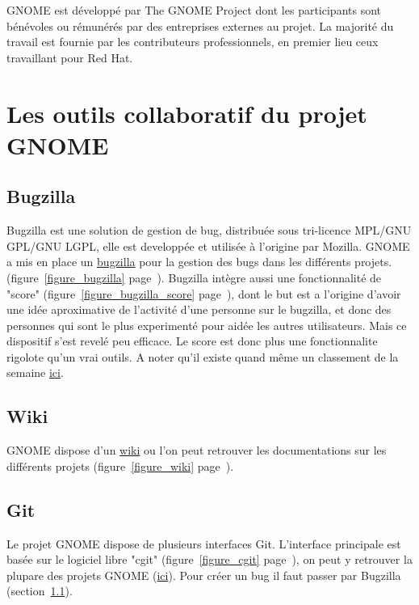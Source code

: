 \documentclass[12pt]{report}
\begin{document}
GNOME est développé par The GNOME Project dont les participants sont
bénévoles ou rémunérés par des entreprises externes au projet. La
majorité du travail est fournie par les contributeurs professionnels,
en premier lieu ceux travaillant pour Red Hat.

\section{Les outils collaboratif du projet GNOME} 
\subsection{Bugzilla}
\label{bugzilla}
Bugzilla est une solution de gestion de bug, distribuée sous tri-licence 
MPL/GNU GPL/GNU LGPL, elle est developpée et utilisée à l'origine par Mozilla.
GNOME a mis en place un \href{https://bugzilla.gnome.org}{bugzilla} pour 
la gestion des bugs dans les différents projets.
(figure~\ref{figure_bugzilla} page~\pageref{figure_bugzilla}).
\newline
Bugzilla intègre aussi une fonctionnalité de "score" (figure~\ref{figure_bugzilla_score} 
page~\pageref{figure_bugzilla_score}), dont le but est a l'origine d'avoir une idée 
aproximative de l'activité d'une personne  sur le bugzilla, et donc 
des personnes qui sont le plus experimenté pour aidée les autres 
utilisateurs. Mais ce dispositif s'est revelé peu efficace. Le
score est donc plus une fonctionnalite rigolote qu'un vrai outils.
A noter qu'il existe quand même un classement de la semaine 
\href{https://bugzilla.gnome.org/page.cgi?id=weekly-bug-summary.html}{ici}.

\subsection{Wiki}
\label{wiki}
GNOME dispose d'un \href{https://wiki.gnome.org/}{wiki} ou l'on peut retrouver 
les documentations sur les différents projets (figure~\ref{figure_wiki} page~\pageref{figure_wiki}).

\subsection{Git}
\label{git}
\label{cgit}
Le projet GNOME dispose de plusieurs interfaces Git. L'interface 
principale est basée sur le logiciel libre "cgit" (figure~\ref{figure_cgit} 
page~\pageref{figure_cgit}), on peut y retrouver la plupare des projets GNOME 
(\href{https://git.gnome.org/}{ici}). Pour créer un bug il faut passer par Bugzilla (section~\ref{bugzilla}).
\end{document}
